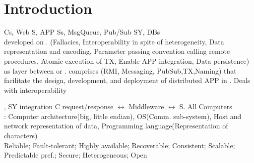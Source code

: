 \section{Introduction}
Cs, Web S, APP Ss, MsgQueue, Pub/Sub SY, DBs 
\\ 
 developed on .
(Fallacies,
Interoperability in spite of heterogeneity,
Data representation and encoding,
Parameter passing convention calling remote procedures,
Atomic execution of TX,
Enable APP integration,
Data persistence)
\\
 as layer between 
or . 
comprises (RMI, Messaging, PubSub,TX,Naming) that facilitate the
design, development, and deployment of distributed APP in
.
Deals with interoperability
\begin{CJK*}{UTF8}{gbsn}
\end{CJK*}, SY integration
\textbar 
C request/response $\leftrightarrow$ Middleware $\leftrightarrow$ S. 
\textbar
All Computers 
\\
:
Computer architecture(big, little endian), 
OS(Comm. sub-system), 
Host and network representation of data, 
Programming language(Representation of characters)
\\
Reliable; 
Fault-tolerant; 
Highly available; 
Recoverable; 
Consistent; 
Scalable; 
Predictable pref.; 
Secure; 
Heterogeneous; 
Open
